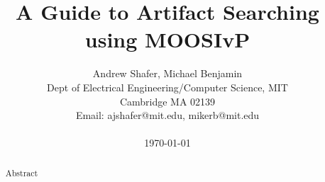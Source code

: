 \documentclass[conference]{IEEEtran}
\begin{document}
\newlength{\pin}
\setlength{\pin}{0.2in}

\newenvironment{hangpar}[1]{\list{}{
    \setlength{\listparindent}{1.5em}       \setlength{\itemindent}{0pt}
    \setlength{\itemsep}{0pt}               \setlength{\parindent}{0pt}
    \setlength{\rightmargin}{0pt}           \setlength{\leftmargin}{#1}
               \parsep                                 \medskipamount}%
    \item\hspace{-\leftmargin}\noindent\ignorespaces}
    {\endlist}


\title{A Guide to Artifact Searching using MOOSIvP}


\author{Andrew Shafer, Michael Benjamin \\
Dept of Electrical Engineering/Computer Science, MIT \\
Cambridge MA 02139 \\
Email: ajshafer@mit.edu, mikerb@mit.edu \\ \\
{\Large{\today}}}
\maketitle



\begin{abstract}
Abstract
\end{abstract}











\small
 


\newpage
\appendix
%
%
%
\end{document}
